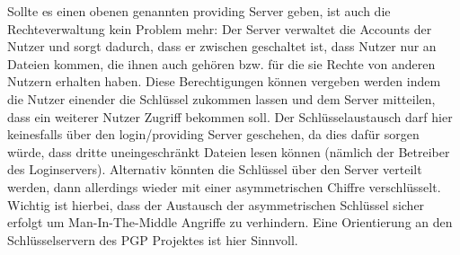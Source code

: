 \documentclass[12pt,a4paper,bibliography=totocnumbered,listof=totocnumbered]{scrartcl}
\begin{document}
Sollte es einen obenen genannten providing Server geben, ist auch die Rechteverwaltung kein Problem mehr: Der Server verwaltet die Accounts der Nutzer und sorgt dadurch, dass er zwischen geschaltet ist, dass Nutzer nur an Dateien kommen, die ihnen auch gehören bzw. für die sie Rechte von anderen Nutzern erhalten haben. Diese Berechtigungen können vergeben werden indem die Nutzer einender die Schlüssel zukommen lassen und dem Server mitteilen, dass ein weiterer Nutzer Zugriff bekommen soll. Der Schlüsselaustausch darf hier keinesfalls über den login/providing Server geschehen, da dies dafür sorgen würde, dass dritte uneingeschränkt Dateien lesen können (nämlich der Betreiber des Loginservers). Alternativ könnten die Schlüssel über den Server verteilt werden, dann allerdings wieder mit einer asymmetrischen Chiffre verschlüsselt. Wichtig ist hierbei, dass der Austausch der asymmetrischen Schlüssel sicher erfolgt um Man-In-The-Middle Angriffe zu verhindern. Eine Orientierung an den Schlüsselservern des PGP Projektes ist hier Sinnvoll.
\end{document}
